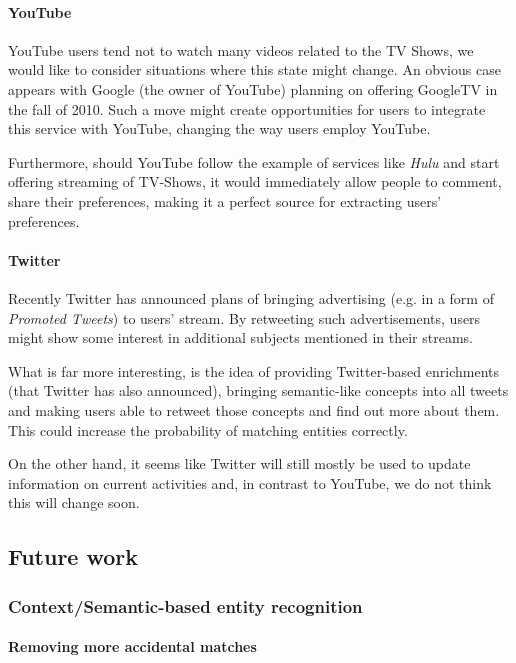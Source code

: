 \paragraph{YouTube}

YouTube users tend not to watch many videos related to the TV Shows, we would
like to consider situations where this state might change. An obvious case
appears with Google (the owner of YouTube) planning on offering GoogleTV in the
fall of 2010. Such a move might create opportunities for users to integrate
this service with YouTube, changing the way users employ YouTube.

Furthermore, should YouTube follow the example of services like \textit{Hulu}
and start offering streaming of TV-Shows, it would immediately allow people to
comment, share their preferences, making it a perfect source for extracting
users' preferences.

\paragraph{Twitter}

Recently Twitter has announced plans of bringing advertising (e.g. in a form of
\textit{Promoted Tweets}) to users' stream.  By retweeting such advertisements,
users might show some interest in additional subjects mentioned in their
streams.

What is far more interesting, is the idea of providing Twitter-based
enrichments (that Twitter has also announced), bringing semantic-like concepts
into all tweets and making users able to retweet those concepts and find out
more about them. This could increase the probability of matching entities
correctly.

On the other hand, it seems like Twitter will still mostly be used to update
information on current activities and, in contrast to YouTube, we do not think
this will change soon.

\subsection{Future work}

\subsubsection{Context/Semantic-based entity recognition}

\paragraph{Removing more accidental matches}

